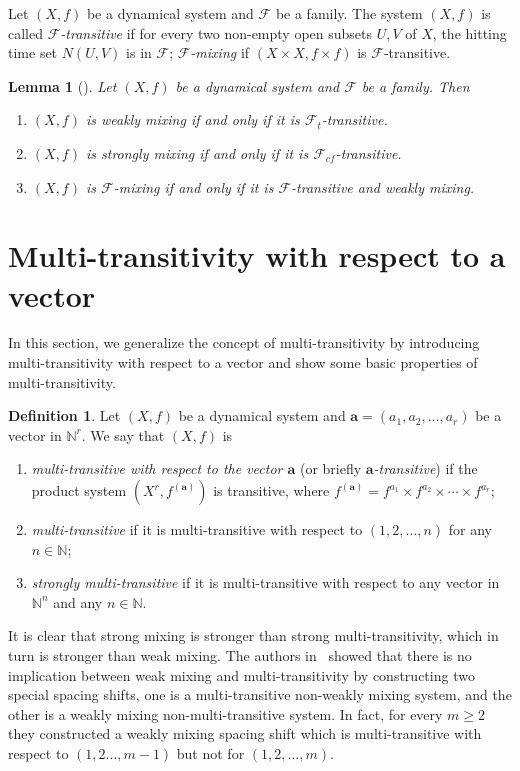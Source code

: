 \documentclass[12pt,a4paper]{amsart}
\newtheorem{lem}[thm]{Lemma}
\theoremstyle{definition}
\newtheorem{de}[thm]{Definition}
\numberwithin{equation}{section}
\begin{document}
Let $(X,f)$ be a dynamical system and $\mathcal{F}$ be a family.
The system $(X,f)$ is called \emph{$\mathcal F$-transitive}
if for every two non-empty open subsets $U,V$ of $X$, the hitting time set $N(U,V)$ is in $\mathcal F$;
\emph{$\mathcal F$-mixing} if $(X\times X, f\times f)$ is $\mathcal F$-transitive.

\begin{lem}[\cite{A97,Furstenberg-1967}]
Let $(X, f)$ be a dynamical system and $\mathcal F$ be a family.
Then
\begin{enumerate}
\item $(X,f)$ is weakly mixing if and only if it is $\mathcal F_{t}$-transitive.
\item $(X,f)$ is strongly mixing if and only if it is $\mathcal F_{cf}$-transitive.
\item $(X,f)$ is $\mathcal F$-mixing if and only if it is $\mathcal F$-transitive and weakly mixing.
\end{enumerate}
\end{lem}

\section{Multi-transitivity with respect to a vector}
In this section, we generalize the concept of multi-transitivity by introducing
multi-transitivity with respect to a vector and show some basic properties of multi-transitivity.

\begin{de}\label{def:muti-trans}
Let $(X, f)$ be a dynamical system and $\mathbf{a}=(a_{1}, a_{2}, \dotsc, a_r)$ be a vector in $\mathbb{N}^r$.
We say that $(X,f)$ is
\begin{enumerate}
\item \emph{multi-transitive with respect to the vector $\mathbf{a}$}
(or briefly \emph{$\mathbf{a}$-transitive})
if the product system $(X^r,  f^{(\mathbf{a})})$ is transitive,
where $f^{(\mathbf{a})}=f^{a_{1}}\times f^{a_{2}}\times \dotsb \times f^{a_{r}}$;
\item \emph{multi-transitive}
if it is multi-transitive with respect to $(1,2,\dotsc,n)$ for any $n\in\mathbb N$;
\item \emph{strongly multi-transitive}
if it is multi-transitive with respect to any vector in $\mathbb{N}^n$ and any $n\in\mathbb{N}$.
\end{enumerate}
\end{de}

It is clear that strong mixing is stronger than strong multi-transitivity, which in turn is stronger than
weak mixing. The authors in~\cite{D-Kwietniak-P-Oprocha-2010} showed that
there is no implication between weak mixing and multi-transitivity by constructing two special spacing shifts,
one is a multi-transitive non-weakly mixing system,
and the other is a weakly mixing non-multi-transitive system.
In fact, for every $m\geq 2$ they constructed a weakly mixing spacing shift
which is multi-transitive with respect to $(1,2\dotsc,m-1)$ but not for $(1,2,\dotsc,m)$.
\end{document}
